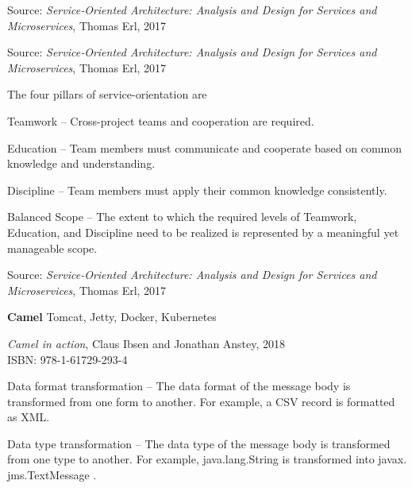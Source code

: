\documentclass[Screen16to9,17pt]{foils}
\begin{document}
Source: \emph{Service‑Oriented Architecture: Analysis and Design for Services and Microservices}, Thomas Erl, 2017




Source: \emph{Service‑Oriented Architecture: Analysis and Design for Services and Microservices}, Thomas Erl, 2017


The four pillars of service-orientation are
\begin{list2}
\item Teamwork – Cross-project teams and cooperation are required.
\item Education – Team members must communicate and cooperate based on common knowledge and understanding.
\item Discipline – Team members must apply their common knowledge consistently.
\item Balanced Scope – The extent to which the required levels of Teamwork, Education, and Discipline need to be realized is represented by a meaningful yet manageable scope.
\end{list2}
Source: \emph{Service‑Oriented Architecture: Analysis and Design for Services and Microservices}, Thomas Erl, 2017



 {\bf Camel} Tomcat, Jetty, Docker, Kubernetes




 \emph{Camel in action}, Claus Ibsen and Jonathan Anstey, 2018\\
 ISBN: 978-1-61729-293-4




 \begin{list2}
 \item Data format transformation -- The data format of the message body is transformed
 from one form to another. For example, a CSV record is formatted as XML.
 \item Data type transformation -- The data type of the message body is transformed from
 one type to another. For example, java.lang.String is transformed into javax.
 jms.TextMessage .
 \end{list2}
\end{document}

